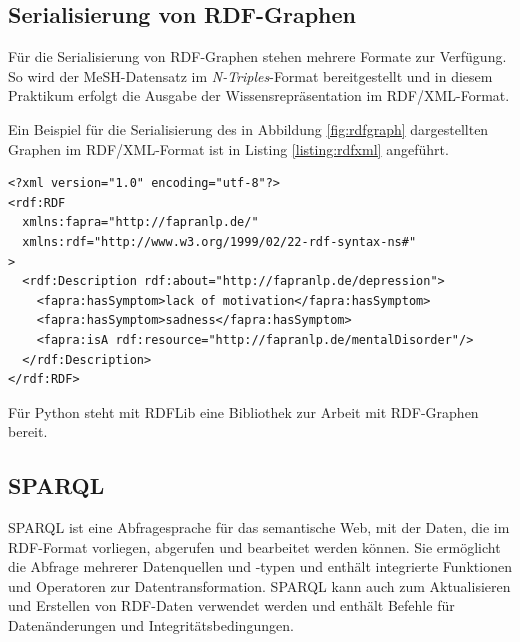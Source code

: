 \subsection{Serialisierung von RDF-Graphen}

Für die Serialisierung von RDF-Graphen stehen mehrere Formate zur Verfügung. So wird der MeSH-Datensatz im \emph{N-Triples}-Format bereitgestellt und in diesem Praktikum erfolgt die Ausgabe der Wissensrepräsentation im RDF/XML-Format.

Ein Beispiel für die Serialisierung des in Abbildung \ref{fig:rdfgraph} dargestellten Graphen im RDF/XML-Format ist in Listing \ref{listing:rdfxml} angeführt.

\lstset{language=XML, caption=RDF/XML, label=listing:rdfxml}
\begin{lstlisting}
<?xml version="1.0" encoding="utf-8"?>
<rdf:RDF
  xmlns:fapra="http://fapranlp.de/"
  xmlns:rdf="http://www.w3.org/1999/02/22-rdf-syntax-ns#"
>
  <rdf:Description rdf:about="http://fapranlp.de/depression">
    <fapra:hasSymptom>lack of motivation</fapra:hasSymptom>
    <fapra:hasSymptom>sadness</fapra:hasSymptom>
    <fapra:isA rdf:resource="http://fapranlp.de/mentalDisorder"/>
  </rdf:Description>
</rdf:RDF>
\end{lstlisting}




Für Python steht mit RDFLib \cite{rdflib_team_rdflib_2022} eine Bibliothek zur Arbeit mit RDF-Graphen bereit.

\subsection{SPARQL}
\ac{SPARQL} ist eine Abfragesprache für das semantische Web, mit der Daten, die im RDF-Format vorliegen, abgerufen und bearbeitet werden können. Sie ermöglicht die Abfrage mehrerer Datenquellen und -typen und enthält integrierte Funktionen und Operatoren zur Datentransformation. SPARQL kann auch zum Aktualisieren und Erstellen von RDF-Daten verwendet werden und enthält Befehle für Datenänderungen und Integritätsbedingungen. 